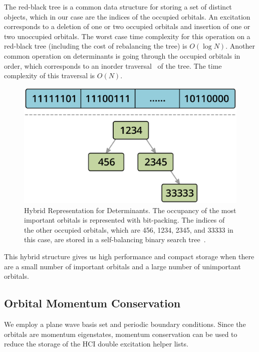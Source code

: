 The red-black tree is a common data structure for storing a set of distinct objects, which in our case are the indices of the occupied orbitals.
An excitation corresponds to a deletion of one or two occupied orbitals and insertion of one or two unoccupied orbitals.
The worst case time complexity for this operation on a red-black tree (including the cost of rebalancing the tree) is $O(\log N)$.
Another common operation on determinants is going through the occupied orbitals in order, which corresponds to an inorder traversal~\cite{wiki:treetraversal} of the tree.
The time complexity of this traversal is $O(N)$.
\begin{figure}
  \begin{center}
  \includegraphics[width=0.9\linewidth]{figs/HybridDet.eps}
  \end{center}
  \vspace{-0.2cm}
  \caption{Hybrid Representation for Determinants.
  The occupancy of the most important orbitals is represented with bit-packing.
  The indices of the other occupied orbitals, which are 456, 1234, 2345, and 33333 in this case, are stored in a self-balancing binary search tree~\cite{wiki:redblacktree}.
  }
  \label{fig:hybrid}
\end{figure}
This hybrid structure gives us high performance and compact storage when there are a small number of important orbitals and a large number of unimportant orbitals.

\subsection{Orbital Momentum Conservation}
We employ a plane wave basis set and periodic boundary conditions.
Since the orbitals are momentum eigenstates, momentum conservation can be used
to reduce the storage of the HCI double excitation helper lists.

